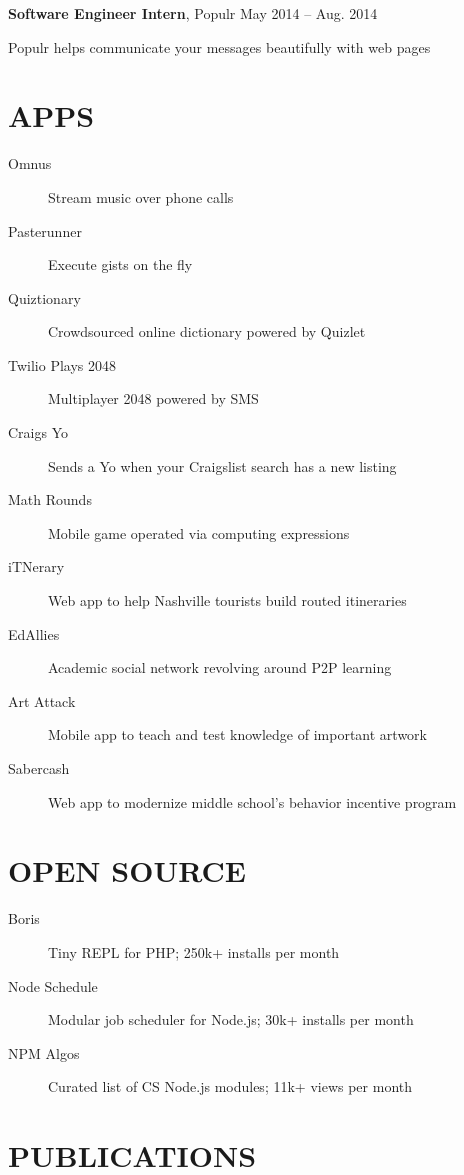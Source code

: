 \documentclass{res}
\begin{document}
{\bf Software Engineer Intern}, Populr \hfill May 2014 -- Aug. 2014
\begin{description}
  \item Populr helps communicate your messages beautifully with web pages
\end{description}

\section{APPS}

\begin{description}
  \item[Omnus] Stream music over phone calls
  \item[Pasterunner] Execute gists on the fly
  \item[Quiztionary] Crowdsourced online dictionary powered by Quizlet
  \item[Twilio Plays 2048] Multiplayer 2048 powered by SMS
  \item[Craigs Yo] Sends a Yo when your Craigslist search has a new listing
  \item[Math Rounds] Mobile game operated via computing expressions
  \item[iTNerary] Web app to help Nashville tourists build routed itineraries
  \item[EdAllies] Academic social network revolving around P2P learning
  \item[Art Attack] Mobile app to teach and test knowledge of important artwork
  \item[Sabercash] Web app to modernize middle school's behavior incentive program
\end{description}

\section{OPEN SOURCE}

\begin{description}
  \item[Boris] Tiny REPL for PHP; 250k+ installs per month
  \item[Node Schedule] Modular job scheduler for Node.js; 30k+ installs per month
  \item[NPM Algos] Curated list of CS Node.js modules; 11k+ views per month
\end{description}

\section{PUBLICATIONS}
\end{document}
